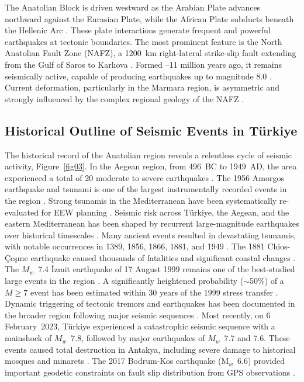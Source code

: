 \documentclass[data,article,accept,pdftex,moreauthors]{Definitions/mdpi}
\begin{document}
The Anatolian Block is driven westward as the Arabian Plate advances northward against the Eurasian Plate, while the African Plate subducts beneath the Hellenic Arc \cite{McKenzie1972,LePichon2010}. These plate interactions generate frequent and powerful earthquakes at tectonic boundaries. The most prominent feature is the North Anatolian Fault Zone (NAFZ), a 1200~km right-lateral strike-slip fault extending from the Gulf of Saros to Karlıova \cite{Barka1992,Sengor2005,Jolivet2023_SolidEarth}. Formed --11 million years ago, it remains seismically active, capable of producing earthquakes up to magnitude 8.0 \cite{Stein1997}. Current deformation, particularly in the Marmara region, is asymmetric and strongly influenced by the complex regional geology of the NAFZ \cite{schiffer2019localized,Andrieux}.

\subsection{Historical Outline of Seismic Events in Türkiye}

The historical record of the Anatolian region reveals a relentless cycle of seismic activity, Figure~\ref{fig03}. In the Aegean region, from 496~BC to 1949~AD, the area experienced a total of 20 moderate to severe earthquakes \cite{altinok2011,papazachos2000}. The 1956 Amorgos earthquake and tsunami is one of the largest instrumentally recorded events in the region \cite{okals2009}. Strong tsunamis in the Mediterranean have been systematically re-evaluated for EEW planning \cite{papadopoulos2007}. Seismic risk across T\"{u}rkiye, the Aegean, and the eastern Mediterranean has been shaped by recurrent large-magnitude earthquakes over historical timescales \cite{Burton1984}. Many ancient events resulted in devastating tsunamis, with notable occurrences in 1389, 1856, 1866, 1881, and 1949 \cite{yalciner2002}. The 1881 Chios-\c{C}e\c{s}me earthquake caused thousands of fatalities and significant coastal \linebreak changes \cite{ambraseys2000}. The $M_w$~7.4 \.{I}zmit earthquake of 17 August 1999 remains one of the best-studied large events in the region \cite{Altinoketal2001,Inanetal2007}. A significantly heightened probability ($\sim$50\%) of a $M \geq 7$ event has been estimated within 30 years of the 1999 stress transfer \cite{Parsons2004}. Dynamic triggering of tectonic tremors and earthquakes has been documented in the broader region following major seismic sequences \cite{Yao2024,DeSalvio2023}. Most recently, on 6 February~2023, Türkiye experienced a catastrophic seismic sequence with a mainshock of $M_w$~7.8, followed by major earthquakes of $M_w$~7.7 and 7.6. These events caused total destruction in Antakya, including severe damage to historical mosques and minarets \cite{Akinci2025,Toprak2025,Yilmaz2025}. The 2017 Bodrum-Kos earthquake (M$_w$~6.6) provided important geodetic constraints on fault slip distribution from GPS observations \cite{Tiryakiogluetal2017}.
\end{document}
